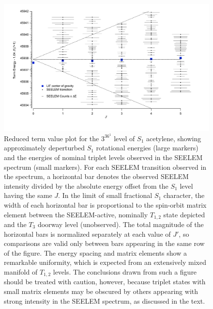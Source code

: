 \documentclass[12pt]{mitthesis}
\begin{document}
\begin{figure}
  \caption{Reduced term value plot for the $3^36^1$  level of
    $S_1$ acetylene, showing approximately deperturbed $S_1$
    rotational energies (large markers) and the energies of nominal
    triplet levels observed in the SEELEM spectrum (small markers).
    For each SEELEM transition observed in the spectrum, a horizontal
    bar denotes the observed SEELEM intensity divided by the absolute
    energy offset from the $S_1$ level having the same $J$.  In the
    limit of small fractional $S_1$ character, the width of each
    horizontal bar is proportional to the spin-orbit matrix element
    between the SEELEM-active, nominally $T_{1,2}$ state depicted and
    the $T_3$ doorway level (unobserved).  The total magnitude of the
    horizontal bars is normalized separately at each value of $J'$, so
    comparisons are valid only between bars appearing in the same row
    of the figure.  The energy spacing and matrix elements show a
    remarkable uniformity, which is expected from an extensively mixed
    manifold of $T_{1,2}$ levels.  The conclusions drawn from such a
    figure should be treated with caution, however, because triplet
    states with small matrix elements may be obscured by others
    appearing with strong intensity in the SEELEM spectrum, as
    discussed in the text.}
  \label{fig:unfold}
  \centering
  \vspace{10mm}
  \includegraphics[width=6.2in]{redterms-3361-unfolded}
\end{figure}

\end{document}
